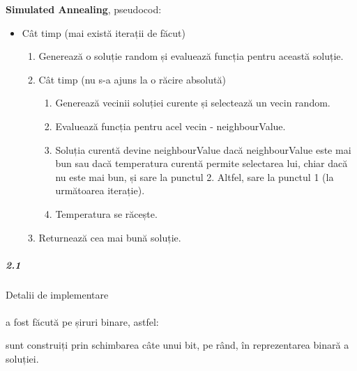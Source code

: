 \documentclass[paper=a4, fontsize=11pt]{scrartcl}
\DeclarePairedDelimiter{\ceil}{\lceil}{\rceil}
\begin{document}
\textbf{Simulated Annealing}, pseudocod:

\begin{itemize}
    \item[] Cât timp (mai există iterații de făcut)
    \begin{enumerate}
        \item Generează o soluție random și evaluează funcția pentru această soluție.
        \item Cât timp (nu s-a ajuns la o răcire absolută)
        \begin{enumerate}
            \item Generează vecinii soluției curente și selectează un vecin random.
            \item Evaluează funcția pentru acel vecin - neighbourValue.
            \item Soluția curentă devine neighbourValue dacă neighbourValue este mai bun sau dacă temperatura curentă permite selectarea lui, chiar dacă nu este mai bun, și sare la punctul 2. Altfel, sare la punctul 1 (la următoarea iterație).
            \item Temperatura se răcește.
        \end{enumerate}
        \item Returnează cea mai bună soluție.
    \end{enumerate}
\end{itemize} 

\subparagraph{2.1}
Detalii de implementare

\paragraph{}
\underline{} a fost făcută pe șiruri binare, astfel: 

\underline{} sunt construiți prin schimbarea câte unui bit, pe rând, în reprezentarea binară a soluției.
\end{document}
